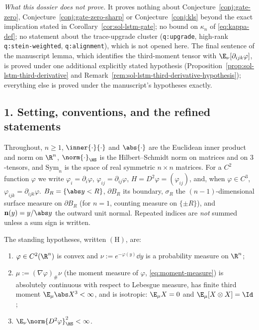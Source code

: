 \documentclass[../main.tex]{subfiles}
\begin{document}
\emph{What this dossier does not prove.}  It proves nothing about
Conjecture~\ref{conj:gate-zero}, Conjecture~\ref{conj:gate-zero-sharp} or
Conjecture~\ref{conj:kls} beyond the exact implication stated in
Corollary~\ref{cor:sol-lstm-gate}; no bound on $\kappa_n$ of \eqref{eq:kappa-def}; no
statement about the trace-upgrade cluster (\texttt{q:upgrade}, high-rank
\texttt{q:stein-weighted}, \texttt{q:alignment}), which is not opened here.  The final
sentence of the manuscript lemma, which identifies the third-moment tensor with
$\E_\nu[\partial_{ijk}\varphi]$, is proved under one additional explicitly stated hypothesis
(Proposition~\ref{prop:sol-lstm-third-derivative} and
Remark~\ref{rem:sol-lstm-third-derivative-hypothesis}); everything else is proved under the
manuscript's hypotheses exactly.

\subsection*{1. Setting, conventions, and the refined statements}

Throughout, $n\ge1$, $\inner{\cdot}{\cdot}$ and $\abs{\cdot}$ are the Euclidean inner product
and norm on $\R^n$, $\norm{\cdot}_{\HS}$ is the Hilbert--Schmidt norm on matrices and on
$3$-tensors, and $\mathrm{Sym}_n$ is the space of real symmetric $n\times n$ matrices.
For a $C^2$ function $\varphi$ we write $\varphi_i=\partial_i\varphi$,
$\varphi_{ij}=\partial_{ij}\varphi$, $H=D^2\varphi=(\varphi_{ij})$, and, when $\varphi\in C^3$,
$\varphi_{ijk}=\partial_{ijk}\varphi$.  $B_R=\{\abs y<R\}$, $\partial B_R$ its boundary,
$\sigma_R$ the $(n-1)$-dimensional surface measure on $\partial B_R$ (for $n=1$, counting
measure on $\{\pm R\}$), and $\mathbf n(y)=y/\abs y$ the outward unit normal.  Repeated indices
are \emph{not} summed unless a sum sign is written.

\begin{definition}[Hypotheses]
\label{def:sol-lstm-hyp}
The standing hypotheses, written $(\mathrm H)$, are:
\begin{enumerate}
\item[$(\mathrm H1)$] $\varphi\in C^2(\R^n)$ is convex and $\nu:=e^{-\varphi(y)}\dd y$ is a
  probability measure on $\R^n$;
\item[$(\mathrm H2)$] $\mu:=(\nabla\varphi)_\#\nu$ (the moment measure of $\varphi$,
  \eqref{eq:moment-measure}) is absolutely continuous with respect to Lebesgue measure, has
  finite third moment $\E_\mu\abs X^3<\infty$, and is isotropic: $\E_\mu X=0$ and
  $\E_\mu[X\otimes X]=\Id$;
\item[$(\mathrm H3)$] $\E_\nu\norm{D^2\varphi}_{\HS}^2<\infty$.
\end{enumerate}
\end{definition}
\end{document}
